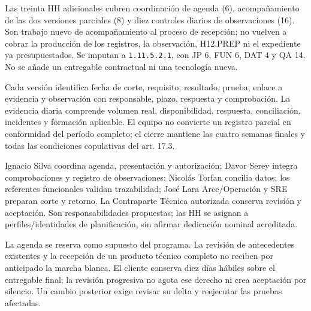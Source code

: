 Las treinta HH adicionales cubren coordinación de agenda (6), acompañamiento de las dos versiones parciales (8) y diez controles diarios de observaciones (16). Son trabajo nuevo de acompañamiento al proceso de recepción; no vuelven a cobrar la producción de los registros, la observación, H12.PREP ni el expediente ya presupuestados. Se imputan a \texttt{1.11.5.2.1}, con JP 6, FUN 6, DAT 4 y QA 14. No se añade un entregable contractual ni una tecnología nueva.

Cada versión identifica fecha de corte, requisito, resultado, prueba, enlace a evidencia y observación con responsable, plazo, respuesta y comprobación. La evidencia diaria comprende volumen real, disponibilidad, respuesta, conciliación, incidentes y formación aplicable. El equipo no convierte un registro parcial en conformidad del período completo; el cierre mantiene las cuatro semanas finales y todas las condiciones copulativas del art. 17.3.

Ignacio Silva coordina agenda, presentación y autorización; Davor Serey integra comprobaciones y registro de observaciones; Nicolás Torfan concilia datos; los referentes funcionales validan trazabilidad; José Lara Arce/Operación y SRE preparan corte y retorno. La Contraparte Técnica autorizada conserva revisión y aceptación. Son responsabilidades propuestas; las HH se asignan a perfiles/identidades de planificación, sin afirmar dedicación nominal acreditada.

La agenda se reserva como supuesto del programa. La revisión de antecedentes existentes y la recepción de un producto técnico completo no reciben por anticipado la marcha blanca. El cliente conserva diez días hábiles sobre el entregable final; la revisión progresiva no agota ese derecho ni crea aceptación por silencio. Un cambio posterior exige revisar su delta y reejecutar las pruebas afectadas.


